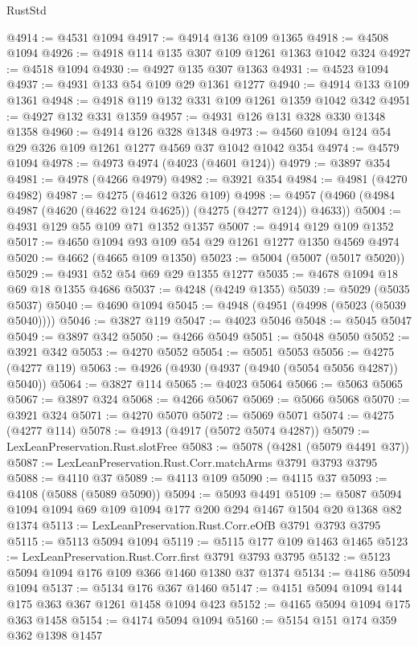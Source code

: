 \begin{lexlean}{RustStd}
\begin{coremodule}
@4914 := @4531 @1094
@4917 := @4914 @136 @109 @1365
@4918 := @4508 @1094
@4926 := @4918 @114 @135 @307 @109 @1261 @1363 @1042 @324
@4927 := @4518 @1094
@4930 := @4927 @135 @307 @1363
@4931 := @4523 @1094
@4937 := @4931 @133 @54 @109 @29 @1361 @1277
@4940 := @4914 @133 @109 @1361
@4948 := @4918 @119 @132 @331 @109 @1261 @1359 @1042 @342
@4951 := @4927 @132 @331 @1359
@4957 := @4931 @126 @131 @328 @330 @1348 @1358
@4960 := @4914 @126 @328 @1348
@4973 := @4560 @1094 @124 @54 @29 @326 @109 @1261 @1277 @4569 @37 @1042 @1042 @354
@4974 := @4579 @1094
@4978 := @4973 @4974 (@4023 (@4601 @124))
@4979 := @3897 @354
@4981 := @4978 (@4266 @4979)
@4982 := @3921 @354
@4984 := @4981 (@4270 @4982)
@4987 := @4275 (@4612 @326 @109)
@4998 := @4957 (@4960 (@4984 @4987 (@4620 (@4622 @124 @4625)) (@4275 (@4277 @124)) @4633))
@5004 := @4931 @129 @55 @109 @71 @1352 @1357
@5007 := @4914 @129 @109 @1352
@5017 := @4650 @1094 @93 @109 @54 @29 @1261 @1277 @1350 @4569 @4974
@5020 := @4662 (@4665 @109 @1350)
@5023 := @5004 (@5007 (@5017 @5020))
@5029 := @4931 @52 @54 @69 @29 @1355 @1277
@5035 := @4678 @1094 @18 @69 @18 @1355 @4686
@5037 := @4248 (@4249 @1355)
@5039 := @5029 (@5035 @5037)
@5040 := @4690 @1094
@5045 := @4948 (@4951 (@4998 (@5023 (@5039 @5040))))
@5046 := @3827 @119
@5047 := @4023 @5046
@5048 := @5045 @5047
@5049 := @3897 @342
@5050 := @4266 @5049
@5051 := @5048 @5050
@5052 := @3921 @342
@5053 := @4270 @5052
@5054 := @5051 @5053
@5056 := @4275 (@4277 @119)
@5063 := @4926 (@4930 (@4937 (@4940 (@5054 @5056 @4287)) @5040))
@5064 := @3827 @114
@5065 := @4023 @5064
@5066 := @5063 @5065
@5067 := @3897 @324
@5068 := @4266 @5067
@5069 := @5066 @5068
@5070 := @3921 @324
@5071 := @4270 @5070
@5072 := @5069 @5071
@5074 := @4275 (@4277 @114)
@5078 := @4913 (@4917 (@5072 @5074 @4287))
@5079 := LexLeanPreservation.Rust.slotFree
@5083 := @5078 (@4281 (@5079 @4491 @37))
@5087 := LexLeanPreservation.Rust.Corr.matchArms @3791 @3793 @3795
@5088 := @4110 @37
@5089 := @4113 @109
@5090 := @4115 @37
@5093 := @4108 (@5088 (@5089 @5090))
@5094 := @5093 @4491
@5109 := @5087 @5094 @1094 @1094 @69 @109 @1094 @177 @200 @294 @1467 @1504 @20 @1368 @82 @1374
@5113 := LexLeanPreservation.Rust.Corr.eOfB @3791 @3793 @3795
@5115 := @5113 @5094 @1094
@5119 := @5115 @177 @109 @1463 @1465
@5123 := LexLeanPreservation.Rust.Corr.first @3791 @3793 @3795
@5132 := @5123 @5094 @1094 @176 @109 @366 @1460 @1380 @37 @1374
@5134 := @4186 @5094 @1094
@5137 := @5134 @176 @367 @1460
@5147 := @4151 @5094 @1094 @144 @175 @363 @367 @1261 @1458 @1094 @423
@5152 := @4165 @5094 @1094 @175 @363 @1458
@5154 := @4174 @5094 @1094
@5160 := @5154 @151 @174 @359 @362 @1398 @1457

\end{coremodule}
\end{lexlean}
